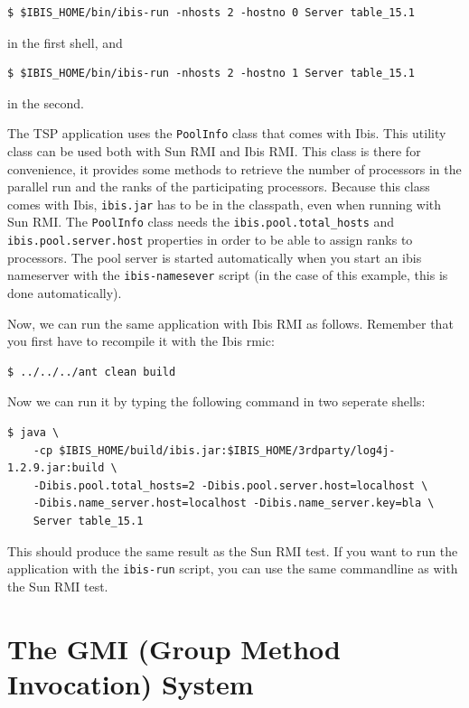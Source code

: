 \documentclass[10pt]{article}
\newcommand{\mysection}[1]{\section{#1}\label{#1}}
\begin{document}
\begin{verbatim}
$ $IBIS_HOME/bin/ibis-run -nhosts 2 -hostno 0 Server table_15.1
\end{verbatim}

\noindent
in the first shell, and

\begin{verbatim}
$ $IBIS_HOME/bin/ibis-run -nhosts 2 -hostno 1 Server table_15.1
\end{verbatim}

\noindent in the second.

The TSP application uses the \texttt{PoolInfo}
class that comes with Ibis. This utility class can be used both with
Sun RMI and Ibis RMI. This class is there for convenience, it provides
some methods to retrieve the number of processors in the parallel run
and the ranks of the participating processors. Because this class
comes with Ibis, \texttt{ibis.jar} has to be in the classpath, even
when running with Sun RMI.  The \texttt{PoolInfo} class needs the
\texttt{ibis.pool.total\_hosts} and \texttt{ibis.pool.server.host}
properties in order to be able to assign ranks to processors. The
pool server is started automatically when you start an ibis nameserver
with the \texttt{ibis-namesever} script (in the case of this example, this is done automatically).

Now, we can run the same application with Ibis RMI as follows.
Remember that you first have to recompile it with the Ibis rmic:
\begin{verbatim}
$ ../../../ant clean build
\end{verbatim}
\noindent
Now we can run it by typing the following command in two seperate shells:
\begin{verbatim}
$ java \
    -cp $IBIS_HOME/build/ibis.jar:$IBIS_HOME/3rdparty/log4j-1.2.9.jar:build \
    -Dibis.pool.total_hosts=2 -Dibis.pool.server.host=localhost \
    -Dibis.name_server.host=localhost -Dibis.name_server.key=bla \
    Server table_15.1 
\end{verbatim}
\noindent

This should produce the same result as the Sun RMI test.
If you want to run the application with the \texttt{ibis-run} script,
you can use the same commandline as with the Sun RMI test.

\mysection{The GMI (Group Method Invocation) System}
\label{gmi-sec}
\end{document}
